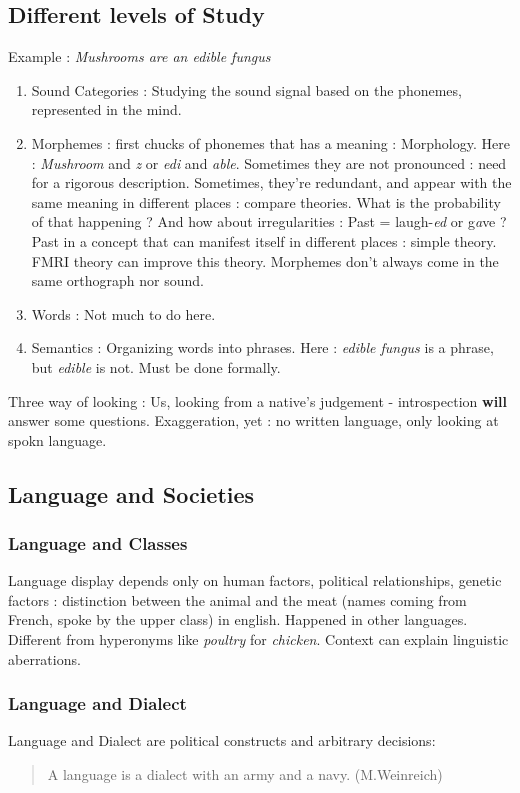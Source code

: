 \documentclass{cours}
\begin{document}
\subsection{Different levels of Study}
Example\! : \textsl{Mushrooms are an edible fungus}
\begin{enumerate}
    \item Sound Categories\! : Studying the sound signal based on the phonemes, represented in the mind.
    \item Morphemes\! : first chucks of phonemes that has a meaning\! : Morphology. Here\! : \textsl{Mushroom} and \textsl{z} or \textsl{edi} and \textsl{able}. Sometimes they are not pronounced\! : need for a rigorous description. Sometimes, they're redundant, and appear with the same meaning in different places\! : compare theories. What is the probability of that happening ? And how about irregularities\! : Past = laugh-\textit{ed} or g\textit{a}ve ? Past in a concept that can manifest itself in different places\! : simple theory. FMRI theory can improve this theory. Morphemes don't always come in the same orthograph nor sound.
    \item Words\! : Not much to do here.
    \item Semantics\! : Organizing words into phrases. Here\! : \textsl{edible fungus} is a phrase, but \textsl{edible} is not. Must be done formally.
\end{enumerate}
Three way of looking\! : Us, looking from a native's judgement - introspection \textbf{will} answer some questions.
Exaggeration, yet\! : no written language, only looking at spokn language.

\subsection{Language and Societies}
\subsubsection{Language and Classes}
Language display depends only on human factors, political relationships, genetic factors\! : distinction between the animal and the meat (names coming from French, spoke by the upper class) in english. Happened in other languages. Different from hyperonyms like \textit{poultry} for \textit{chicken}. Context can explain linguistic aberrations.
\subsubsection{Language and Dialect}
Language and Dialect are political constructs and arbitrary decisions\!: \begin{quote}
    A language is a dialect with an army and a navy. (M.Weinreich)
\end{quote}
\end{document}
